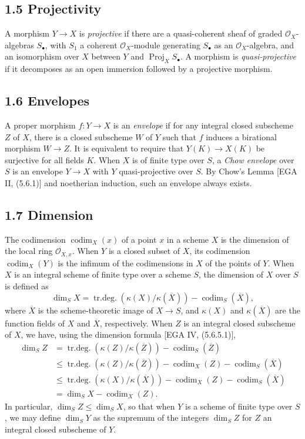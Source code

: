 \documentclass[11pt]{article}
\newcommand{\OO}{\mathcal O}
\newcommand{\codim}{\operatorname{codim}}
\newcommand{\Proj}{\operatorname{Proj}}
\newcommand{\trdeg}{\operatorname{tr.deg.}}
\begin{document}
\subsection*{1.5 Projectivity}
A morphism $Y\to X$ is \emph{projective} if there are a quasi-coherent sheaf of graded $\OO_X$-algebras $S_\bullet$, with $S_1$ a coherent $\OO_X$-module generating $S_\bullet$ as an $\OO_X$-algebra, and an isomorphism over $X$ between $Y$ and $\Proj_XS_\bullet$. A morphism is \emph{quasi-projective} if it decomposes as an open immersion followed by a projective morphism.

\subsection*{1.6 Envelopes}
A proper morphism $f:Y\to X$ is an \emph{envelope} if for any integral closed subscheme $Z$ of $X$, there is a closed subscheme $W$ of $Y$ such that $f$ induces a birational morphism $W\to Z$. It is equivalent to require that $Y(K)\to X(K)$ be surjective for all fields $K$. When $X$ is of finite type over $S$, a \emph{Chow envelope} over $S$ is an envelope $Y\to X$ with $Y$ quasi-projective over $S$. By Chow's Lemma [EGA II, (5.6.1)] and noetherian induction, such an envelope always exists.

\subsection*{1.7 Dimension}
The codimension $\codim_X(x)$ of a point $x$ in a scheme $X$ is the dimension of the local ring $\OO_{X,x}$. When $Y$ is a closed subset of $X$, its codimension $\codim_X(Y)$ is the infimum of the codimensions in $X$ of the points of $Y$. When $X$ is an integral scheme of finite type over a scheme $S$, the dimension of $X$ over $S$ is defined as
\[
\dim_SX=\trdeg(\kappa(X)/\kappa(\overline X))-\codim_S(\overline X),
\]
where $\overline X$ is the scheme-theoretic image of $X\to S$, and $\kappa(X)$ and $\kappa(\overline X)$ are the function fields of $X$ and $\overline X$, respectively. When $Z$ is an integral closed subscheme of $X$, we have, using the dimension formula [EGA IV, (5.6.5.1)],
\begin{align*}
\dim_SZ&=\trdeg(\kappa(Z)/\kappa(\overline Z))-\codim_S(\overline Z)\\
&\leq\trdeg(\kappa(Z)/\kappa(\overline Z))-\codim_X(Z)-\codim_S(\overline X)\\
&\leq\trdeg(\kappa(X)/\kappa(\overline X))-\codim_X(Z)-\codim_S(\overline X)\\
&=\dim_SX-\codim_X(Z).
\end{align*}
In particular, $\dim_SZ\leq\dim_SX$, so that when $Y$ is a scheme of finite type over $S$, we may define $\dim_SY$ as the supremum of the integers $\dim_SZ$ for $Z$ an integral closed subscheme of $Y$.
\end{document}
